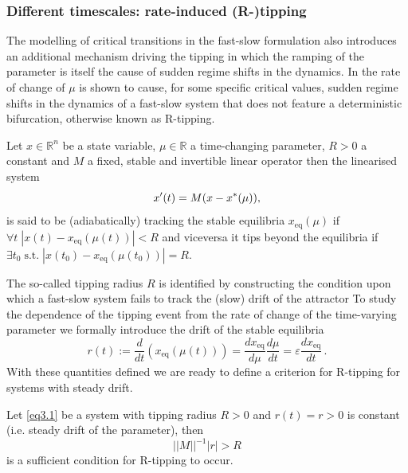 \documentclass[../main.tex]{subfiles}
\begin{document}
\subsubsection{Different timescales: rate-induced (R-)tipping}\label{subsubsec3.1.2}
The modelling of critical transitions in the fast-slow formulation also introduces an additional mechanism driving the tipping in which the ramping of the parameter is itself the cause of sudden regime shifts in the dynamics. 
In \cite{Ashwin12} the rate of change of $\mu$ is shown to cause, for some specific critical values, sudden regime shifts in the dynamics of a fast-slow system that does not feature a deterministic bifurcation, otherwise known as R-tipping. 
\begin{definition}[]\label{def3.2}
        Let $x\in \mathbb{R}^{n}$ be a state variable, $\mu\in \mathbb{R}$ a time-changing parameter, $R>0$ a constant and $M$ a fixed, stable and invertible linear operator then the linearised system
        \begin{equation*}
             x'(t)=M(x-x^{*}(\mu)),
        \end{equation*}
        is said to be (adiabatically) tracking the stable equilibria $x_{\text{eq}}(\mu)$ if $\forall t\;|x(t)-x_{\text{eq}}(\mu(t))|<R$ and viceversa it tips beyond the equilibria if $\exists t_{0}\;\text{s.t.}\;|x(t_0)-x_{\text{eq}}(\mu(t_0))|=R$. 
\end{definition}
The so-called tipping radius $R$ is identified by constructing the condition upon which a fast-slow system fails to track the (slow) drift of the attractor
To study the dependence of the tipping event from the rate of change of the time-varying parameter we formally introduce the drift of the stable equilibria
\begin{equation*}
        r(t):=\frac{d}{dt}(x_{\text{eq}}(\mu(t))) = \frac{dx_{\text{eq}}}{d\mu}\frac{d\mu}{dt} = \varepsilon \frac{dx_{\text{eq}}}{dt}\,.
\end{equation*}
With these quantities defined we are ready to define a criterion for R-tipping for systems with steady drift.
\begin{theorem}[label=thm3.2]{}{}
Let \eqref{eq3.1} be a system with tipping radius $R>0$ and $r(t)=r>0$ is constant (i.e. steady drift of the parameter), then 
\begin{equation*}
          ||M||^{-1}|r|>R
\end{equation*}
is a sufficient condition for R-tipping to occur.
\end{theorem}
\end{document}
